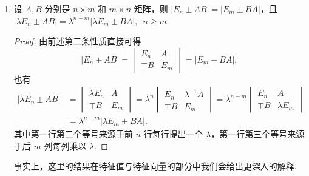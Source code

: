 \begin{enumerate}
\begin{proof}
              读者会发现，我们在上面的证明中多次使用$\begin{vmatrix}
                      A & O \\ C & B
                  \end{vmatrix} = \begin{vmatrix}
                      A & D \\ O & B
                  \end{vmatrix} = |A||B|$这一性质，因此这一性质是相当重要的，需要读者熟悉.

              本条的其他结论推导类似于上方，在此不再赘述，感兴趣的读者可以自行推导（关键在于第三类分块初等矩阵行列式为1），实际上结论并不是很重要，重要的是在于领悟使用行列式分块计算性质和打洞法的基本方法.
          \end{proof}

          根据上面的结论，如果 $A$ 和 $D$ 均可逆，我们有 $|A||D-CA^{-1}B|=|D||A-BD^{-1}C|$，这一公式称为. 降阶公式的具体应用可以参考\autoref{ex:降阶公式的应用}.

          \item 设 $A,B$ 分别是 $n \times m$ 和 $m \times n$ 矩阵，则 $|E_n \pm AB|=|E_m \pm BA|$，且 \\
          $|\lambda E_n \pm AB|=\lambda^{n-m}|\lambda E_m \pm BA|,\enspace n \geqslant m$.
          \begin{proof}
              由前述第二条性质直接可得
              \[|E_n \pm AB|=\begin{vmatrix}
                      E_n & A \\ \mp B & E_m
                  \end{vmatrix}=|E_m \pm BA|,\]
              也有
              \begin{align*}
                  |\lambda E_n \pm AB|
                   & =\begin{vmatrix}
                          \lambda E_n & A \\ \mp B & E_m
                      \end{vmatrix}=\lambda^n
                  \begin{vmatrix}
                      E_n & \lambda^{-1}A \\ \mp B & E_m
                  \end{vmatrix}=\lambda^{n-m}\begin{vmatrix}
                                                 E_n & A \\ \mp B & \lambda E_m
                                             \end{vmatrix} \\
                   & = \lambda^{n-m}|\lambda E_m \pm BA|.
              \end{align*}
              其中第一行第二个等号来源于前 $n$ 行每行提出一个 $\lambda$，第一行第三个等号来源于后 $m$ 列每列乘以 $\lambda$.
          \end{proof}

          事实上，这里的结果在特征值与特征向量的部分中我们会给出更深入的解释.
\end{enumerate}

